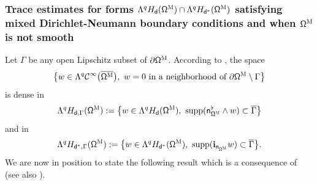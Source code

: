\documentclass[10pt]{amsart}
\let\pa\partial
\DeclareMathOperator\supp{supp}
\theoremstyle{plain}
\theoremstyle{definition}
\begin{document}
\subsubsection*{Trace estimates for forms $ \Lambda^q H_{\mathsf d} (\mathsf \Omega^{\textsc{M}})\cap \Lambda^q H_{\mathsf d^*} (\mathsf \Omega^{\textsc{M}})$ satisfying mixed Dirichlet-Neumann boundary conditions and when $\mathsf \Omega^{\textsc{M}}$ is not smooth}
Let $\Gamma$ be any open Lipschitz subset of $\partial \mathsf \Omega^{\textsc{M}}$. According to \cite[Prop.\,3.1]{jakab-mitrea-mitrea-09},
the space
\[
\big \{w\in\Lambda^q\mathcal C^\infty\bigl(\overline{\mathsf \Omega^{\textsc{M}}}\bigr),\
w= 0 \text{ in a neighborhood of } \pa\mathsf \Omega^{\textsc{M}}\setminus \Gamma \big \}
\]
is dense in
\[
\Lambda^q H_{\mathsf d,\Gamma} (\mathsf \Omega^{\textsc{M}}):= \big \{w\in\Lambda^q H_{\mathsf d} (\mathsf \Omega^{\textsc{M}}),\
\supp(\mathsf n_{\mathsf \Omega^{\textsc{M}}}^{\flat} \wedge w)\subset \overline\Gamma \big \}
\]
and in
\[
\Lambda^q H_{\mathsf d^*,\Gamma} (\mathsf \Omega^{\textsc{M}}):= \big \{w\in\Lambda^q H_{\mathsf d^*} (\mathsf \Omega^{\textsc{M}}),\
\supp(\mathbf{i}_{\mathsf n_{\mathsf \Omega^{\textsc{M}}}} w)\subset \overline\Gamma \big \}.
\]
We are now in position to state the following result which is a consequence of \cite[Th.\,1.1 \&~1.2]{jakab-mitrea-mitrea-09} (see also \cite[Th.\,4.1 \&~4.2]{goldshtein-mitrea-mitrea-11}).
\end{document}
